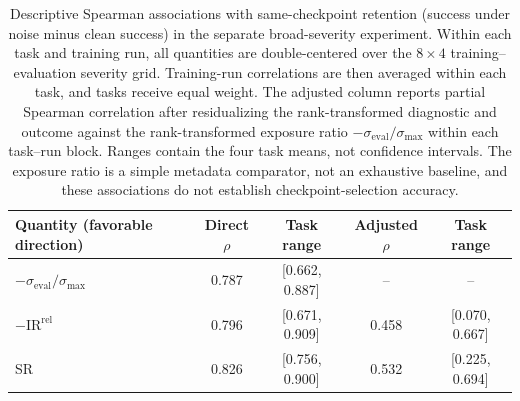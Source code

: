 \begin{table}[!htb]
\centering
\caption{Descriptive Spearman associations with same-checkpoint retention
(success under noise minus clean success) in the separate broad-severity
experiment. Within each task and training run, all quantities are
double-centered over the $8\times4$ training--evaluation severity grid.
Training-run correlations are then averaged within each task, and tasks receive
equal weight. The adjusted column reports partial Spearman correlation after
residualizing the rank-transformed diagnostic and outcome against the
rank-transformed exposure ratio
$-\sigma_{\mathrm{eval}}/\sigma_{\max}$ within each task--run block.
Ranges contain the four task means, not confidence intervals. The exposure
ratio is a simple metadata comparator, not an exhaustive baseline, and these
associations do not establish checkpoint-selection accuracy.}
\label{tab:multiseverity-associations}
\small
\begin{tabular}{lcccc}
\toprule
Quantity (favorable direction) & Direct $\rho$ & Task range & Adjusted $\rho$ & Task range \\
\midrule
$-\sigma_{\mathrm{eval}}/\sigma_{\max}$ & 0.787 & [0.662, 0.887] & -- & -- \\
$-\mathrm{IR}^{\mathrm{rel}}$ & 0.796 & [0.671, 0.909] & 0.458 & [0.070, 0.667] \\
SR & 0.826 & [0.756, 0.900] & 0.532 & [0.225, 0.694] \\
\bottomrule
\end{tabular}
\end{table}
